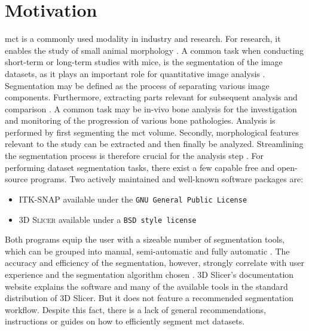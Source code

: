\section{Motivation}\label{s:introduction-motivation}
\acrfull{mct} is a commonly used modality in industry and research.
For research, it enables the study of small animal morphology \cite{percianoInsight3DMicroCT2017}.
A common task when conducting short-term or long-term studies with mice, is the segmentation of the image datasets, as it plays an important role for quantitative image analysis \cite{sheppardTechniquesHelicalScanning2014}.
Segmentation may be defined as the process of separating various image components.
Furthermore, extracting parts relevant for subsequent analysis and comparison \cite{percianoInsight3DMicroCT2017}.
A common task may be in-vivo bone analysis for the investigation and monitoring of the progression of various bone pathologies.
Analysis is performed by first segmenting the \acrshort{mct} volume.
Secondly, morphological features relevant to the study can be extracted and then finally be analyzed.
Streamlining the segmentation process is therefore crucial for the analysis step \cite{percianoInsight3DMicroCT2017,korfiatisIndependentActiveContours2017}.
\newline
For performing \mct\space dataset segmentation tasks, there exist a few capable free and open-source programs.
Two actively maintained and well-known \cite{virziComprehensiveReview3D2020,mandoliniComparisonThree3D2022,virziComprehensiveReview3D2020} software packages are:
\begin{itemize}
	\item \textsc{ITK-SNAP} \cite{yushkevichUserguided3DActive2006} available under the \texttt{GNU General Public License} \cite{licenseGnuGeneralPublic1989}
	\item \textsc{3D Slicer} \cite{kikinis3DSlicerPlatform2014} available under a \texttt{BSD style license} \cite{gaudeulPublicProvisionPrivate2005}
\end{itemize}
Both programs equip the user with a sizeable number of segmentation tools, which can be grouped into manual, semi-automatic and fully automatic \cite{percianoInsight3DMicroCT2017}.
The accuracy and efficiency of the segmentation, however, strongly correlate with user experience and the segmentation algorithm chosen \cite{mandoliniComparisonThree3D2022,aydinRELIABILITYREPRODUCIBILITYTIMEEFFICIENCY2020,arguelloComparisonSegmentationTools2019}.
3D Slicer's documentation website \cite{pinterPolymorphSegmentationRepresentation2019} explains the software and many of the available tools in the standard distribution of 3D Slicer.
But it does not feature a recommended segmentation workflow.
Despite this fact, there is a lack of general recommendations, instructions or guides on how to efficiently segment \acrlong{mct} datasets.

